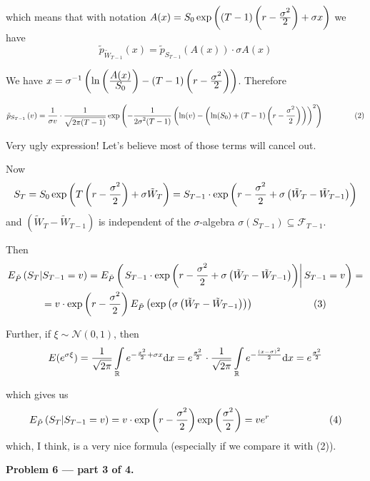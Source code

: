 \documentclass[pdftex,12pt,a4paper]{article}
\renewcommand{\FF}{\mathcal{F}}
\begin{document}
which means that with notation $A(x) = S_{0}\exp \left((T-1)\left(r - \frac{\displaystyle \sigma^{2}}{\displaystyle 2}\right) + \sigma x\right)$ we have
\[
\tilde{p}_{\tilde{W}_{T-1}}(x) = \tilde{p}_{S_{T-1}}\left(A(x)\right)\cdot \sigma A(x)
\]

We have $x = \sigma^{-1}\left(\ln\left(\frac{\displaystyle A(x)}{\displaystyle S_{0}}\right) - (T-1)\left(r - \frac{\displaystyle \sigma^{2}}{\displaystyle 2}\right)\right)$. Therefore

\[
 \tilde{p}_{S_{T-1}}\left(v\right) = \frac{\displaystyle 1}{\displaystyle \sigma v}\cdot \frac{\displaystyle 1}{\displaystyle \sqrt{2\pi (T-1)}}\exp\left(-\frac{\displaystyle 1}{\displaystyle 2\sigma^{2}(T-1)}\left(\ln(v) - \left(\ln(S_{0}) + (T-1)\left(r - \frac{\displaystyle \sigma^{2}}{\displaystyle 2}\right)\right)\right)^{2}\right) \qquad \qquad (2)
\]

Very ugly expression! Let's believe most of those terms will cancel out.

Now
\[
S_{T} = S_{0}\exp \left(T\left(r - \frac{\displaystyle \sigma^{2}}{\displaystyle 2}\right) + \sigma \tilde{W}_{T}\right) = S_{T-1}\cdot \exp\left(r - \frac{\displaystyle \sigma^{2}}{\displaystyle 2} + \sigma \left(\tilde{W}_{T} - \tilde{W}_{T-1}\right)\right)
\]
and $\left(\tilde{W}_{T} - \tilde{W}_{T-1}\right)$ is independent of the $\sigma$-algebra $\sigma(S_{T-1})\subseteq \FF_{T-1}$.


Then
\begin{multline}
 E_{\tilde{P}}\left(S_{T} | S_{T-1} = v\right) =  E_{\tilde{P}}\left(\left.S_{T-1}\cdot \exp\left(r - \frac{\displaystyle \sigma^{2}}{\displaystyle 2} + \sigma \left(\tilde{W}_{T} - \tilde{W}_{T-1}\right)\right) \right| S_{T-1} = v\right) =\\
 = v\cdot\exp\left(r - \frac{\displaystyle \sigma^{2}}{\displaystyle 2}\right) E_{\tilde{P}}\left(\exp\left(\sigma \left(\tilde{W}_{T} - \tilde{W}_{T-1}\right)\right)\right)\qquad\qquad\qquad (3)
\end{multline}


Further, if $\xi \sim \mathcal{N}(0,1)$, then 
\[
E(e^{\sigma\xi}) = \frac{\displaystyle 1}{\displaystyle \sqrt{2\pi}}\int\limits_{\mathbb R}e^{-\frac{x^{2}}{2} + \sigma x}\mathrm{d}x = e^{\frac{\sigma^{2}}{2}}\cdot\frac{\displaystyle 1}{\displaystyle \sqrt{2\pi}}\int\limits_{\mathbb R}e^{-\frac{(x-\sigma)^{2}}{2}}\mathrm{d}x = e^{\frac{\sigma^{2}}{2}}
\]

which gives us
\[
E_{\tilde{P}}\left(S_{T} | S_{T-1} = v\right) = v\cdot\exp\left(r - \frac{\displaystyle \sigma^{2}}{\displaystyle 2}\right)\exp\left(\frac{\displaystyle \sigma^{2}}{\displaystyle 2}\right) = ve^{r}\qquad\qquad\qquad (4)
\]
which, I think, is a very nice formula (especially if we compare it with (2)).


\textbf{Problem 6 --- part 3 of 4.}
\end{document}
